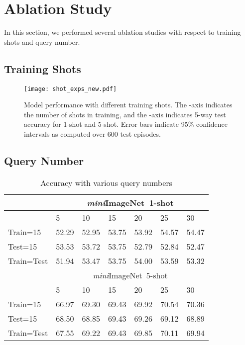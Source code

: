 \documentclass{article} \usepackage{iclr2019_conference,times}
\def\mini{{\textit{mini}ImageNet}}
\begin{document}
\appendix




\section{Ablation Study}

In this section, we performed several ablation studies with respect to training shots and query number.

\subsection{Training Shots}
\label{sec:shots}
\begin{figure}[ht]
  \centering
  \texttt{[image: shot\_exps\_new.pdf]}
  \caption{Model performance with different training shots. The -axis indicates the number of shots in training, and the -axis indicates 5-way test accuracy for 1-shot and 5-shot. Error bars indicate 95\% confidence intervals as computed over 600 test episodes. }
  \label{shot_exps}
\end{figure}


\subsection{Query Number}

\begin{table}[ht]
\centering
\small
\caption{Accuracy with various query numbers}
\begin{tabular}{l|llllll}
\hline
           & \multicolumn{6}{c}{\mini~1-shot} \\ \hline
           & 5     & 10    & 15    & 20    & 25     & 30                \\ \hline
Train=15   & 52.29 & 52.95 & 53.75 & 53.92 & 54.57  & 54.47   \\
Test=15    & 53.53 & 53.72 & 53.75 & 52.79 & 52.84  & 52.47   \\
Train=Test & 51.94 & 53.47 & 53.75 & 54.00 & 53.59  & 53.32  \\ \hline
           & \multicolumn{6}{c}{\mini~5-shot}  \\ \hline
           & 5     & 10    & 15    & 20    & 25    & 30 \\ \hline
Train=15   & 66.97 & 69.30 & 69.43 & 69.92 & 70.54 &  70.36    \\
Test=15    & 68.50 & 68.85 & 69.43 & 69.26 & 69.12 & 68.89    \\      
Train=Test & 67.55 & 69.22 & 69.43 & 69.85 & 70.11 & 69.94    \\ \hline
\end{tabular}
\label{tab:query}
\end{table}
\end{document}
